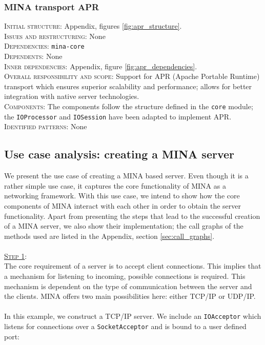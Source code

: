 \subsubsection{MINA transport APR}
\textsc{Initial structure}: Appendix, figures \ref{fig:apr_structure}.  \\
\textsc{Issues and restructuring}: None \\
\textsc{Dependencies}: \texttt{mina-core}\\
\textsc{Dependents}: None\\
\textsc{Inner dependencies}: Appendix, figure \ref{fig:apr_dependencies}. \\
\textsc{Overall responsibility and scope}: Support for APR (Apache Portable Runtime) transport which ensures superior scalability and performance; allows for better integration with native server technologies. \\
\textsc{Components}: The components follow the structure defined in the \texttt{core} module; the \texttt{IOProcessor} and \texttt{IOSession} have been adapted to implement APR. \\
\textsc{Identified patterns}: None \\


\subsection{Use case analysis: creating a MINA server}
We present the use case of creating a MINA based server. Even though it is a rather simple use case, it captures the core functionality of MINA as a networking framework. With this use case, we intend to show how the core components of MINA interact with each other in order to obtain the server functionality. Apart from presenting the steps that lead to the successful creation of a MINA server, we also show their implementation; the call graphs of the methods used are listed in the Appendix, section \ref{sec:call_graphs}.\\\\
\underline{\textsc{Step 1}}:\\
The core requirement of a server is to accept client connections. This implies that a mechanism for listening to incoming, possible connections is required. This mechanism is dependent on the type of communication between the server and the clients. MINA offers two main possibilities here: either TCP/IP or UDP/IP.\\\\
In this example, we construct a TCP/IP server. We include an \texttt{IOAcceptor} which listens for connections over a \texttt{SocketAcceptor} and is bound to a user defined port:

